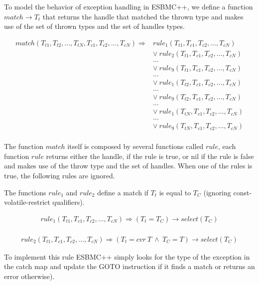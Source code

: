 \documentclass[a4paper]{llncs}
\begin{document}
To model the behavior of exception handling in ESBMC++, we define a function
$match \rightarrow T_t$ that returns the handle that matched the thrown type
and makes use of the set of thrown types and the set of handles types.

\[\begin{array}{ll}
match(T_{t1}, T_{t2}, \ldots, T_{tN}, T_{c1}, T_{c2}, \ldots, T_{cN}) \Longrightarrow & rule_1(T_{t1},T_{c1}, T_{c2}, \ldots, T_{cN}) \\
  & \vee \: rule_2(T_{t1},T_{c1}, T_{c2}, \ldots, T_{cN}) \\
  & \ldots \\
  & \vee \: rule_9(T_{t1},T_{c1}, T_{c2}, \ldots, T_{cN}) \\
  & \ldots \\
  & \vee \: rule_1(T_{t2},T_{c1}, T_{c2}, \ldots, T_{cN}) \\
  & \ldots \\
  & \vee \: rule_9(T_{t2},T_{c1}, T_{c2}, \ldots, T_{cN}) \\
  & \ldots \\
  & \vee \: rule_1(T_{tN},T_{c1}, T_{c2}, \ldots, T_{cN}) \\
  & \ldots \\
  & \vee \: rule_9(T_{tN},T_{c1}, T_{c2}, \ldots, T_{cN}) \\
\end{array}\]

The function $match$ itself is composed by several functions called $rule$,
each function $rule$ returns either the handle, if the rule is true, or nil
if the rule is false and makes use of the throw type and the set of handles.
When one of the rules is true, the following rules are ignored.

The functions $rule_1$ and $rule_2$ define a match if $T_{t}$ is equal to $T_{C}$ (ignoring
const-volatile-restrict qualifiers).

\[\begin{array}{ll}
rule_1(T_{t1},T_{c1}, T_{c2}, \ldots, T_{cN}) \Longrightarrow
  (T_{t} = T_{C})\rightarrow select(T_{C}) \\
\end{array}\]

\[\begin{array}{ll}
rule_2(T_{t1},T_{c1}, T_{c2}, \ldots, T_{cN}) \Longrightarrow
  (T_{t} = cvr \: T \: \wedge \: T_{C} = T)\rightarrow select(T_{C})
\end{array}\]

To implement this rule ESBMC++ simply looks for the type of the exception
in the catch map and update the GOTO instruction if it finds a match or
returns an error otherwise).
\end{document}
